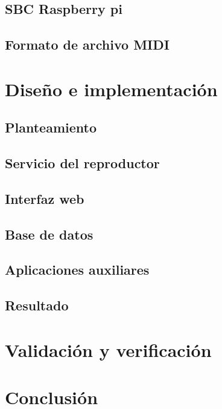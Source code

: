 \documentclass[10pt,a4paper]{article}
\begin{document}
	\subsection{SBC Raspberry pi}
	
	\subsection{Formato de archivo MIDI}
	
	
	\section{Diseño e implementación}
	
	\subsection{Planteamiento}
	
	\subsection{Servicio del reproductor}
	
	\subsection{Interfaz web}
	
	\subsection{Base de datos}
	
	\subsection{Aplicaciones auxiliares}
	
	\subsection{Resultado}
	
	
	\section{Validación y verificación}
	
	
	\section{Conclusión}
\end{document}
